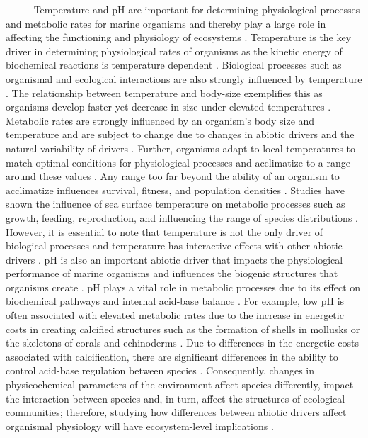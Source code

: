 \documentclass[
  12pt,
]{article}
\begin{document}
~~~~~ Temperature and pH are important for determining physiological
processes and metabolic rates for marine organisms and thereby play a
large role in affecting the functioning and physiology of ecosystems
\cite{woodwell1970effects}. Temperature is the key driver in determining
physiological rates of organisms as the kinetic energy of biochemical
reactions is temperature dependent
\cite{levins1968evolution, somero2002thermal, portner2012integrating}.
Biological processes such as organismal and ecological interactions are
also strongly influenced by temperature \cite{hochachka2002biochemical}.
The relationship between temperature and body-size exemplifies this as
organisms develop faster yet decrease in size under elevated
temperatures \cite{elahi2020historical}. Metabolic rates are strongly
influenced by an organism's body size and temperature and are subject to
change due to changes in abiotic drivers and the natural variability of
drivers \cite{brown2004toward, o2007temperature}. Further, organisms
adapt to local temperatures to match optimal conditions for
physiological processes and acclimatize to a range around these values
\cite{sinclair2016can}. Any range too far beyond the ability of an
organism to acclimatize influences survival, fitness, and population
densities \cite{hochachka2002biochemical}. Studies have shown the
influence of sea surface temperature on metabolic processes such as
growth, feeding, reproduction, and influencing the range of species
distributions
\cite{kordas2011community, sanford2002feeding, pinsky2013marine}.
However, it is essential to note that temperature is not the only driver
of biological processes and temperature has interactive effects with
other abiotic drivers \cite{darling2008quantifying}. pH is also an
important abiotic driver that impacts the physiological performance of
marine organisms and influences the biogenic structures that organisms
create \cite{hofmann2010living}. pH plays a vital role in metabolic
processes due to its effect on biochemical pathways and internal
acid-base balance \cite{gaylord2015ocean}. For example, low pH is often
associated with elevated metabolic rates due to the increase in
energetic costs in creating calcified structures such as the formation
of shells in mollusks or the skeletons of corals and echinoderms
\cite{doney2009ocean, spalding2017energetic}. Due to differences in the
energetic costs associated with calcification, there are significant
differences in the ability to control acid-base regulation between
species \cite{doney2009ocean}. Consequently, changes in physicochemical
parameters of the environment affect species differently, impact the
interaction between species and, in turn, affect the structures of
ecological communities; therefore, studying how differences between
abiotic drivers affect organismal physiology will have ecosystem-level
implications \cite{tomanek2002physiological, barclay2019variation}.
\end{document}
